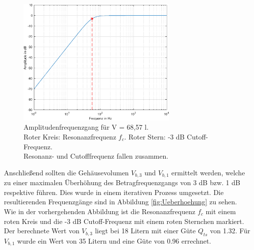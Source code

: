 \begin{figure}[H]
    \centering
    \includegraphics[width=0.7\textwidth]{Figures/Normaler_Frequenzgang.eps}
    \captionsetup{justification=centering}
    \caption{Amplitudenfrequenzgang für V = 68,57 l.\\
    Roter Kreis: Resonanzfrequenz $f_c$. Roter Stern: -3 dB Cutoff-Frequenz.\\
    Resonanz- und Cutofffrequenz fallen zusammen.}
    \label{fig:Normaler_Frequenzgang}
\end{figure}%

Anschließend sollten die Gehäusevolumen $V_{b,3}$ und $V_{b,1}$ ermittelt werden, welche zu einer maximalen Überhöhung des Betragfrequenzgangs von 3 dB bzw. 1 dB respektive führen.
Dies wurde in einem iterativen Prozess umgesetzt.
Die resultierenden Frequenzgänge sind in Abbildung \ref{fig:Ueberhoehung} zu sehen.
Wie in der vorhergehenden Abbildung ist die Resonanzfrequenz $f_c$ mit einem roten Kreis und die -3 dB Cutoff-Frequenz mit einem roten Sternchen markiert.
Der berechnete Wert von $V_{b,3}$ liegt bei 18 Litern mit einer Güte $Q_{ts}$ von 1.32.
Für $V_{b,1}$ wurde ein Wert von 35 Litern und eine Güte von 0.96 errechnet.


